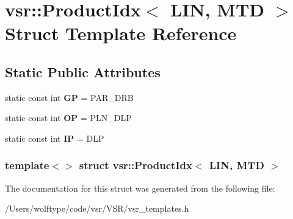 \hypertarget{structvsr_1_1_product_idx_3_01_l_i_n_00_01_m_t_d_01_4}{\section{vsr\-:\-:Product\-Idx$<$ L\-I\-N, M\-T\-D $>$ Struct Template Reference}
\label{structvsr_1_1_product_idx_3_01_l_i_n_00_01_m_t_d_01_4}
}
\subsection*{Static Public Attributes}
\begin{DoxyCompactItemize}
\item 
\hypertarget{structvsr_1_1_product_idx_3_01_l_i_n_00_01_m_t_d_01_4_a622ee31d5320826e942fa5faaa8074ae}{static const int {\bfseries G\-P} = P\-A\-R\-\_\-\-D\-R\-B}\label{structvsr_1_1_product_idx_3_01_l_i_n_00_01_m_t_d_01_4_a622ee31d5320826e942fa5faaa8074ae}

\item 
\hypertarget{structvsr_1_1_product_idx_3_01_l_i_n_00_01_m_t_d_01_4_af2b2ebe71d0421dd8e890253d79ee0b2}{static const int {\bfseries O\-P} = P\-L\-N\-\_\-\-D\-L\-P}\label{structvsr_1_1_product_idx_3_01_l_i_n_00_01_m_t_d_01_4_af2b2ebe71d0421dd8e890253d79ee0b2}

\item 
\hypertarget{structvsr_1_1_product_idx_3_01_l_i_n_00_01_m_t_d_01_4_aa3f753b9eb21c05bdedf43ee1cd01878}{static const int {\bfseries I\-P} = D\-L\-P}\label{structvsr_1_1_product_idx_3_01_l_i_n_00_01_m_t_d_01_4_aa3f753b9eb21c05bdedf43ee1cd01878}

\end{DoxyCompactItemize}
\subsubsection*{template$<$$>$ struct vsr\-::\-Product\-Idx$<$ L\-I\-N, M\-T\-D $>$}



The documentation for this struct was generated from the following file\-:\begin{DoxyCompactItemize}
\item 
/\-Users/wolftype/code/vsr/\-V\-S\-R/vsr\-\_\-templates.\-h\end{DoxyCompactItemize}

